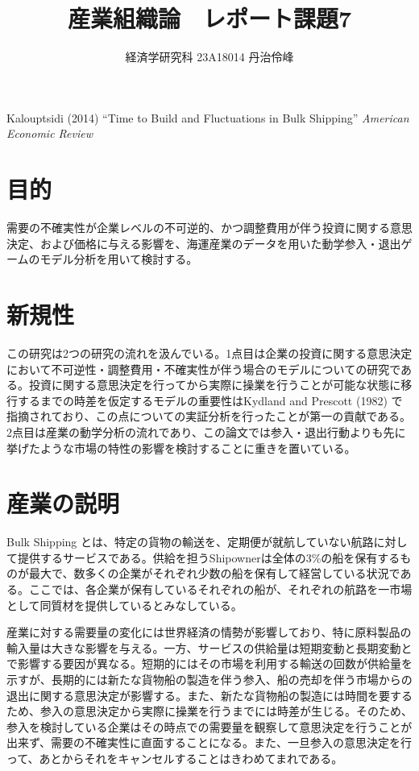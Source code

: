\documentclass[11pt]{jsarticle}
\begin{document}
\title{産業組織論　レポート課題7}
\author{経済学研究科 23A18014 丹治伶峰}
\date{}
\maketitle

\large
Kalouptsidi (2014) ``Time to Build and Fluctuations in Bulk Shipping'' \textit{American Economic Review}

\normalsize

\section{目的}

需要の不確実性が企業レベルの不可逆的、かつ調整費用が伴う投資に関する意思決定、および価格に与える影響を、海運産業のデータを用いた動学参入・退出ゲームのモデル分析を用いて検討する。

\section{新規性}

この研究は2つの研究の流れを汲んでいる。1点目は企業の投資に関する意思決定において不可逆性・調整費用・不確実性が伴う場合のモデルについての研究である。投資に関する意思決定を行ってから実際に操業を行うことが可能な状態に移行するまでの時差を仮定するモデルの重要性はKydland and Prescott (1982) で指摘されており、この点についての実証分析を行ったことが第一の貢献である。2点目は産業の動学分析の流れであり、この論文では参入・退出行動よりも先に挙げたような市場の特性の影響を検討することに重きを置いている。

\section{産業の説明}

Bulk Shipping とは、特定の貨物の輸送を、定期便が就航していない航路に対して提供するサービスである。供給を担うShipownerは全体の3\%の船を保有するものが最大で、数多くの企業がそれぞれ少数の船を保有して経営している状況である。ここでは、各企業が保有しているそれぞれの船が、それぞれの航路を一市場として同質材を提供しているとみなしている。

産業に対する需要量の変化には世界経済の情勢が影響しており、特に原料製品の輸入量は大きな影響を与える。一方、サービスの供給量は短期変動と長期変動とで影響する要因が異なる。短期的にはその市場を利用する輸送の回数が供給量を示すが、長期的には新たな貨物船の製造を伴う参入、船の売却を伴う市場からの退出に関する意思決定が影響する。また、新たな貨物船の製造には時間を要するため、参入の意思決定から実際に操業を行うまでには時差が生じる。そのため、参入を検討している企業はその時点での需要量を観察して意思決定を行うことが出来ず、需要の不確実性に直面することになる。また、一旦参入の意思決定を行って、あとからそれをキャンセルすることはきわめてまれである。
\end{document}
